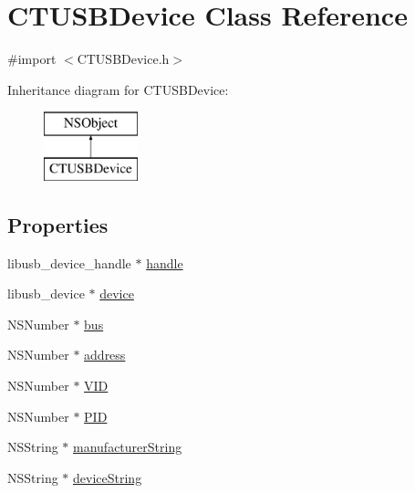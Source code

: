 \hypertarget{interface_c_t_u_s_b_device}{\section{C\-T\-U\-S\-B\-Device Class Reference}
\label{interface_c_t_u_s_b_device}
}


{\ttfamily \#import $<$C\-T\-U\-S\-B\-Device.\-h$>$}

Inheritance diagram for C\-T\-U\-S\-B\-Device\-:\begin{figure}[H]
\begin{center}
\leavevmode
\includegraphics[height=2.000000cm]{interface_c_t_u_s_b_device}
\end{center}
\end{figure}
\subsection*{Properties}
\begin{DoxyCompactItemize}
\item 
libusb\-\_\-device\-\_\-handle $\ast$ \hyperlink{interface_c_t_u_s_b_device_a76090dc447b52913d038e07dfe672f5a}{handle}
\item 
libusb\-\_\-device $\ast$ \hyperlink{interface_c_t_u_s_b_device_afbcf0aa1dd4cb4b4cf0b094790a44884}{device}
\item 
N\-S\-Number $\ast$ \hyperlink{interface_c_t_u_s_b_device_af3ef7825f48c953823546eb03fa1ddde}{bus}
\item 
N\-S\-Number $\ast$ \hyperlink{interface_c_t_u_s_b_device_a73172a48b72ca41f4e1b47af6d8b3cfc}{address}
\item 
N\-S\-Number $\ast$ \hyperlink{interface_c_t_u_s_b_device_ac0c96b6d796529bf0c38611c9b412896}{V\-I\-D}
\item 
N\-S\-Number $\ast$ \hyperlink{interface_c_t_u_s_b_device_a455ff3ce8f9e14f91139a4f62558aa80}{P\-I\-D}
\item 
N\-S\-String $\ast$ \hyperlink{interface_c_t_u_s_b_device_a65ff7b894401291eabdaefe0182d41aa}{manufacturer\-String}
\item 
N\-S\-String $\ast$ \hyperlink{interface_c_t_u_s_b_device_a7f8a84b5aa33f6a961a2c9d8f43127e9}{device\-String}
\end{DoxyCompactItemize}


